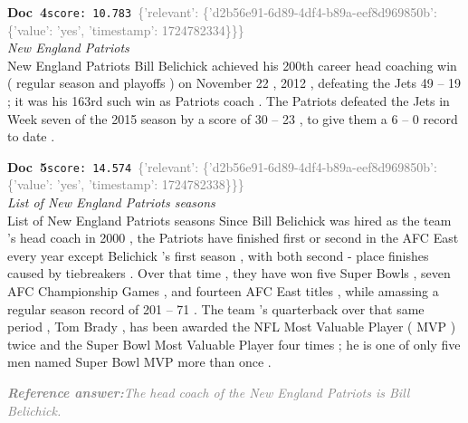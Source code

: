 \documentclass[a4paper,11pt]{article}
\begin{document}
\begin{docenv}
{\footnotesize\textcolor{doccolor}{\textbf{Doc~4}}}\hfill{\tiny\texttt{score:~10.783}}\ {\tiny\textcolor{gray}{\{'relevant': \{'d2b56e91-6d89-4df4-b89a-eef8d969850b': \{'value': 'yes', 'timestamp': 1724782334\}\}\}}}\\[3pt]
{\small\textit{New England Patriots}}\\[2pt]
\vspace{2pt}
{\footnotesize New England Patriots
Bill Belichick achieved his 200th career head coaching win ( regular season and playoffs ) on November 22 , 2012 , defeating the Jets 49 -- 19 ; it was his 163rd such win as Patriots coach . The Patriots defeated the Jets in Week seven of the 2015 season by a score of 30 -- 23 , to give them a 6 -- 0 record to date .}
\end{docenv}
\begin{docenv}
{\footnotesize\textcolor{doccolor}{\textbf{Doc~5}}}\hfill{\tiny\texttt{score:~14.574}}\ {\tiny\textcolor{gray}{\{'relevant': \{'d2b56e91-6d89-4df4-b89a-eef8d969850b': \{'value': 'yes', 'timestamp': 1724782338\}\}\}}}\\[3pt]
{\small\textit{List of New England Patriots seasons}}\\[2pt]
\vspace{2pt}
{\footnotesize List of New England Patriots seasons
Since Bill Belichick was hired as the team 's head coach in 2000 , the Patriots have finished first or second in the AFC East every year except Belichick 's first season , with both second - place finishes caused by tiebreakers . Over that time , they have won five Super Bowls , seven AFC Championship Games , and fourteen AFC East titles , while amassing a regular season record of 201 -- 71 . The team 's quarterback over that same period , Tom Brady , has been awarded the NFL Most Valuable Player ( MVP ) twice and the Super Bowl Most Valuable Player four times ; he is one of only five men named Super Bowl MVP more than once .}
\end{docenv}
\begin{refanswerenv}
{\footnotesize\textit{\textcolor{gray}{\textbf{Reference answer:}\enspace The head coach of the New England Patriots is Bill Belichick.}}}
\end{refanswerenv}
\end{document}
